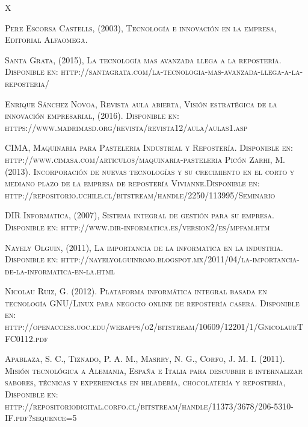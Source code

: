 \documentclass{bmcart}
\begin{document}
\newpage
\renewcommand{\refname}{Referencias}\begin{thebibliography}{X
\newline
\newline}

 \textsc{Pere Escorsa Castells, (2003), Tecnología e innovación en la empresa, Editorial Alfaomega.}

 \textsc{Santa Grata, (2015), La tecnología mas avanzada llega a la repostería. Disponible en: http://santagrata.com/la-tecnologia-mas-avanzada-llega-a-la-reposteria/ }

 \textsc{Enrique Sánchez Novoa, Revista aula abierta, Visión estratégica de la innovación empresarial, (2016). Disponible en: https://www.madrimasd.org/revista/revista12/aula/aulas1.asp}

 \textsc{CIMA, Maquinaria para Pasteleria Industrial y Repostería. Disponible en: http://www.cimasa.com/articulos/maquinaria-pasteleria}
 \textsc{Picón Zarhi, M. (2013). Incorporación de nuevas tecnologías y su crecimiento en el corto y mediano plazo de la empresa de repostería Vivianne.Disponible en: http://repositorio.uchile.cl/bitstream/handle/2250/113995/Seminario}

 \textsc{DIR Informatica, (2007), Sistema integral de gestión para su empresa. Disponible en: 
http://www.dir-informatica.es/version2/es/mpfam.htm}

 \textsc{Nayely Olguin, (2011), La importancia de la informatica en la industria. Disponible en: http://nayelyolguinrojo.blogspot.mx/2011/04/la-importancia-de-la-informatica-en-la.html}

 \textsc{Nicolau Ruiz, G. (2012). Plataforma informática integral basada en tecnología GNU/Linux para negocio online de repostería casera. Disponible en: http://openaccess.uoc.edu/webapps/o2/bitstream/10609/12201/1/GnicolaurTFC0112.pdf}

 \textsc{Apablaza, S. C., Tiznado, P. A. M., Masrry, N. G., Corfo, J. M. I. (2011). Misión tecnológica a Alemania, España e Italia para descubrir e internalizar sabores, técnicas y experiencias en heladería, chocolatería y repostería, Disponible en: http://repositoriodigital.corfo.cl/bitstream/handle/11373/3678/206-5310-IF.pdf?sequence=5}


\end{thebibliography}
\end{document}
